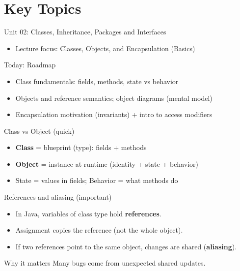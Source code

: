 \documentclass{beamer}
\begin{document}
\section{Key Topics}
\label{sec:concepts}

\begin{frame}{Unit 02: Classes, Inheritance, Packages and Interfaces}
  \begin{itemize}[<+->]
    \item Lecture focus: Classes, Objects, and Encapsulation (Basics)
  \end{itemize}
  \slidesources{\OOPSUnitIISources}
\end{frame}

\begin{frame}{Today: Roadmap}
  \begin{itemize}[<+->]
    \item Class fundamentals: fields, methods, state vs behavior
    \item Objects and reference semantics; object diagrams (mental model)
    \item Encapsulation motivation (invariants) + intro to access modifiers
  \end{itemize}
  \slidesources{\OOPSUnitIISources}
\end{frame}

\begin{frame}{Class vs Object (quick)}
  \begin{itemize}[<+->]
    \item \textbf{Class} = blueprint (type): fields + methods
    \item \textbf{Object} = instance at runtime (identity + state + behavior)
    \item State = values in fields; Behavior = what methods do
  \end{itemize}
  \slidesources{\OOPSUnitIISources}
\end{frame}

\begin{frame}{References and aliasing (important)}
  \begin{itemize}[<+->]
    \item In Java, variables of class type hold \textbf{references}.
    \item Assignment copies the reference (not the whole object).
    \item If two references point to the same object, changes are shared (\textbf{aliasing}).
  \end{itemize}
  \begin{block}{Why it matters}
    Many bugs come from unexpected shared updates.
  \end{block}
  \slidesources{\OOPSUnitIISources}
\end{frame}
\end{document}
